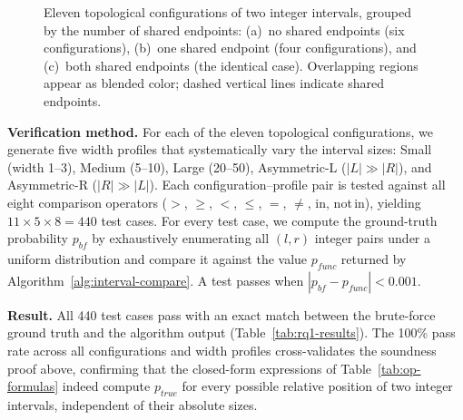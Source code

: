 \documentclass[pdflatex,sn-basic]{sn-jnl}%
\theoremstyle{thmstyleone}%
\theoremstyle{thmstyletwo}%
\theoremstyle{thmstylethree}%
\begin{document}
\begin{figure}[t]
\caption{Eleven topological configurations of two integer intervals,
grouped by the number of shared endpoints:
(a)~no shared endpoints (six configurations), (b)~one shared endpoint (four configurations), and (c)~both shared endpoints (the identical case).
Overlapping regions appear as blended color;
dashed vertical lines indicate shared endpoints.}
\label{fig:interval-topologies}
\end{figure}

\smallskip
\noindent\textbf{Verification method.}
For each of the eleven topological configurations, we generate five width profiles that systematically vary the interval sizes: Small (width 1--3), Medium (5--10), Large (20--50), Asymmetric-L ($|L| \gg |R|$), and Asymmetric-R ($|R| \gg |L|$).
Each configuration--profile pair is tested against all eight comparison operators ($>$, $\geq$, $<$, $\leq$, $=$, $\neq$, in, not\,in), yielding $11 \times 5 \times 8 = 440$ test cases.
For every test case, we compute the ground-truth probability $p_{\mathit{bf}}$ by exhaustively enumerating all $(l, r)$ integer pairs under a uniform distribution and compare it against the value $p_{\mathit{func}}$ returned by Algorithm~\ref{alg:interval-compare}.
A test passes when $|p_{\mathit{bf}} - p_{\mathit{func}}| < 0.001$.

\smallskip
\noindent\textbf{Result.}
All 440 test cases pass with an exact match between the brute-force ground truth and the algorithm output (Table~\ref{tab:rq1-results}).
The 100\% pass rate across all configurations and width profiles cross-validates the soundness proof above, confirming that the closed-form expressions of Table~\ref{tab:op-formulas} indeed compute $p_{\mathit{true}}$ for every possible relative position of two integer intervals, independent of their absolute sizes.
\end{document}
